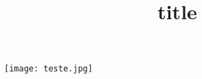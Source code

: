 \documentclass{article}
\title{title}
\begin{document}
 \texttt{[image: teste.jpg]}
 \maketitle
\end{document}
